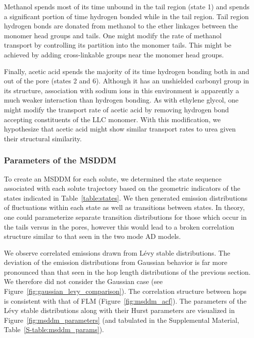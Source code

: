 \documentclass[aps,pre,preprint,groupedaddress,longbibliography]{revtex4-2}
\begin{document}
  Methanol spends most of its time unbound in the tail region (state 1) and
  spends a significant portion of time hydrogen bonded while in the tail
  region. Tail region hydrogen bonds are donated from methanol to the ether
  linkages between the monomer head groups and tails. One might modify the
  rate of methanol transport by controlling its partition into the monomer
  tails. This might be achieved by adding cross-linkable groups near the
  monomer head groups.
  
  Finally, acetic acid spends the majority of its time hydrogen bonding both in
  and out of the pore (states 2 and 6). Although it has an unshielded carbonyl
  group in its structure, association with sodium ions in this environment is
  apparently a much weaker interaction than hydrogen bonding.  As with ethylene
  glycol, one might modify the transport rate of acetic acid by removing
  hydrogen bond accepting constituents of the LLC monomer. With this
  modification, we hypothesize that acetic acid might show similar transport
  rates to urea given their structural similarity.
  
  \subsubsection{Parameters of the MSDDM}\label{section:msddm_parameterization}

  To create an MSDDM for each solute, we determined the state sequence associated
  with each solute trajectory based on the geometric indicators of the states 
  indicated in Table~\ref{table:states}. We then generated emission distributions of fluctuations
  within each state as well as transitions between states. In theory, one could 
  parameterize separate transition distributions for those which occur in the tails 
  versus in the pores, however this would lead to a broken correlation structure 
  similar to that seen in the two mode AD models.

  We observe correlated emissions drawn from L\'evy stable distributions. The
  deviation of the emission distributions from Gaussian behavior is far more
  pronounced than that seen in the hop length distributions of the previous
  section. We therefore did not consider the Gaussian case (see
  Figure~\ref{fig:gaussian_levy_comparison}). The correlation structure
  between hops is consistent with that of FLM (Figure~\ref{fig:msddm_acf}).
  The parameters of the L\'evy stable distributions along with their Hurst
  parameters are visualized in Figure~\ref{fig:msddm_parameters} (and tabulated
  in the Supplemental Material, Table~\ref{S-table:msddm_params}). 
  
\end{document}
